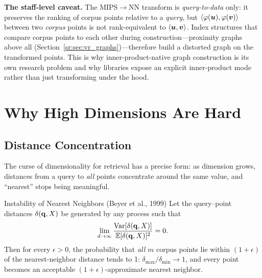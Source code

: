 \textbf{The staff-level caveat.} The MIPS$\to$NN transform is \emph{query-to-data} only: it preserves the ranking of corpus points relative to a \emph{query}, but $\langle\varphi(\bm{u}),\varphi(\bm{v})\rangle$ between two \emph{corpus} points is not rank-equivalent to $\langle\bm{u},\bm{v}\rangle$. Index structures that compare corpus points to each other during construction---proximity graphs above all (Section~\ref{sr:sec:vr_graphs})---therefore build a distorted graph on the transformed points. This is why inner-product-native graph construction is its own research problem and why libraries expose an explicit inner-product mode rather than just transforming under the hood.

\section{Why High Dimensions Are Hard}
\label{sr:sec:vr_highdim}

\subsection{Distance Concentration}

The curse of dimensionality for retrieval has a precise form: as dimension grows, distances from a query to \emph{all} points concentrate around the same value, and ``nearest'' stops being meaningful.

\begin{mathresult}{Instability of Nearest Neighbors (Beyer et al., 1999)}
Let the query--point distances $\delta(\mathbf{q}, X)$ be generated by any process such that
\begin{equation}
\lim_{d\to\infty} \frac{\operatorname{Var}[\delta(\mathbf{q},X)]}{\operatorname{\mathbb{E}}[\delta(\mathbf{q},X)]^2} = 0 .
\end{equation}
Then for every $\epsilon > 0$, the probability that \emph{all} $m$ corpus points lie within $(1+\epsilon)$ of the nearest-neighbor distance tends to 1: $\delta_{\max}/\delta_{\min} \to 1$, and every point becomes an acceptable $(1+\epsilon)$-approximate nearest neighbor.
\end{mathresult}

